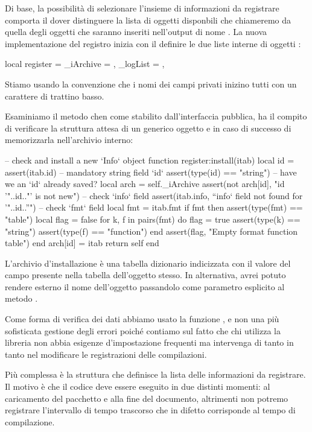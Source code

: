 Di base, la possibilità di selezionare l'insieme di informazioni da registrare
comporta il dover distinguere la lista di oggetti disponbili che chiameremo
 da quella degli oggetti che saranno inseriti nell'output di
nome . La nuova implementazione del registro inizia con il
definire le due liste interne di oggetti :
\begin{lines}
local register = {
    _iArchive = {},
    _logList = {},
}
\end{lines}
Stiamo usando la convenzione che i nomi dei campi privati inizino tutti con un
carattere di trattino basso.

Esaminiamo il metodo  chen come stabilito dall'interfaccia pubblica,
ha il compito di verificare la struttura attesa di un generico oggetto
 e in caso di successo di memorizzarla nell'archivio interno:
\begin{lines}
-- check and install a new `Info` object
function register:install(itab)
    local id = assert(itab.id) -- mandatory string field `id`
    assert(type(id) == "string")
    -- have we an `id` already saved?
    local arch = self._iArchive
    assert(not arch[id], "id '"..id.."' is not new")
    -- check `info` field
    assert(itab.info, "`info` field not found for '"..id.."'")
    -- check `fmt` field
    local fmt = itab.fmt
    if fmt then
        assert(type(fmt) == "table")
        local flag = false
        for k, f in pairs(fmt) do
            flag = true
            assert(type(k) == "string")
            assert(type(f) == "function")
        end
        assert(flag, "Empty format function table")
    end
    arch[id] = itab
    return self
end
\end{lines}

L'archivio d'installazione è una tabella dizionario indicizzata con il valore
del campo  presente nella tabella dell'oggetto  stesso. In
alternativa, avrei potuto rendere esterno il nome dell'oggetto passandolo come
parametro esplicito al metodo .

Come forma di verifica dei dati abbiamo usato la funzione , e non una
più sofisticata gestione degli errori poiché contiamo sul fatto che chi utilizza
la libreria non abbia esigenze d'impostazione frequenti ma intervenga di tanto
in tanto nel modificare le registrazioni delle compilazioni.

Più complessa è la struttura che definisce la lista delle informazioni da
registrare. Il motivo è che il codice deve essere eseguito in due distinti
momenti: al caricamento del pacchetto e alla fine del documento, altrimenti non
potremo registrare l'intervallo di tempo trascorso che in difetto corrisponde al
tempo di compilazione.

